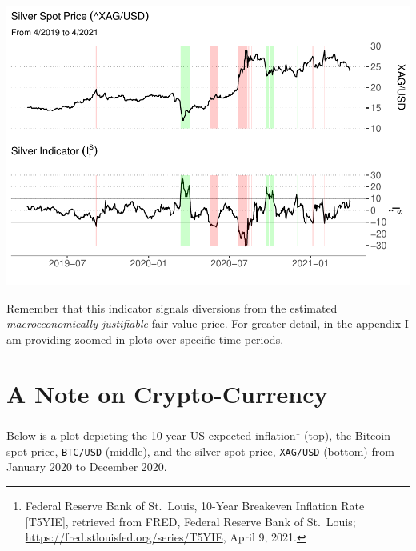 \documentclass[
  12pt,
]{article}
\begin{document}
\includegraphics{silver-market-timing_files/figure-latex/highlighted-plot-1.pdf}

Remember that this indicator signals diversions from the estimated
\emph{macroeconomically justifiable} fair-value price. For greater
detail, in the \protect\hyperlink{appendix-zoomed-plots}{appendix} I am
providing zoomed-in plots over specific time periods.

\hypertarget{a-note-on-crypto-currency}{%
\section{A Note on Crypto-Currency}\label{a-note-on-crypto-currency}}

Below is a plot depicting the 10-year US expected inflation\footnote{Federal
  Reserve Bank of St.~Louis, 10-Year Breakeven Inflation Rate
  {[}T5YIE{]}, retrieved from FRED, Federal Reserve Bank of St.~Louis;
  \url{https://fred.stlouisfed.org/series/T5YIE}, April 9, 2021.} (top),
the Bitcoin spot price, \texttt{BTC/USD} (middle), and the silver spot
price, \texttt{XAG/USD} (bottom) from January 2020 to December 2020.
\end{document}
